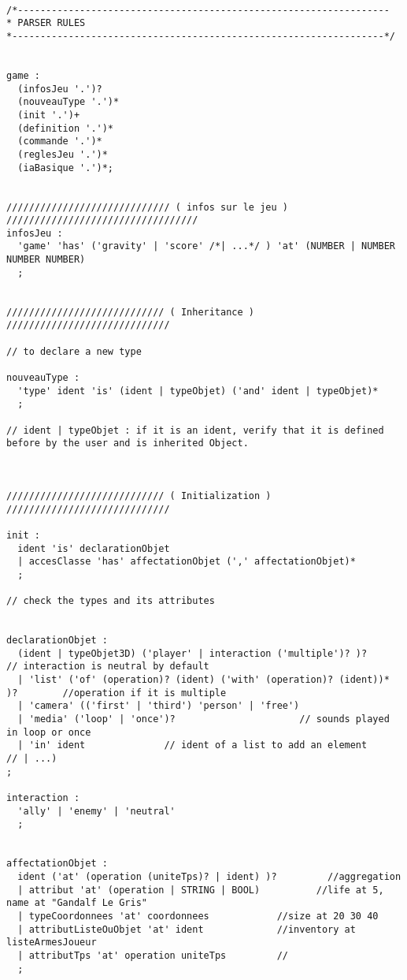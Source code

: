 \begin{lstlisting}[language=GameGrammar]

/*------------------------------------------------------------------
* PARSER RULES
*------------------------------------------------------------------*/
 
 
game :
  (infosJeu '.')?
  (nouveauType '.')*
  (init '.')+
  (definition '.')*
  (commande '.')*
  (reglesJeu '.')*
  (iaBasique '.')*;
 

///////////////////////////// ( infos sur le jeu )  //////////////////////////////////
infosJeu :
  'game' 'has' ('gravity' | 'score' /*| ...*/ ) 'at' (NUMBER | NUMBER NUMBER NUMBER)
  ;
 
 
//////////////////////////// ( Inheritance )  /////////////////////////////
 
// to declare a new type

nouveauType :
  'type' ident 'is' (ident | typeObjet) ('and' ident | typeObjet)*
  ;            
  
// ident | typeObjet : if it is an ident, verify that it is defined before by the user and is inherited Object.
 
 
 
//////////////////////////// ( Initialization )  /////////////////////////////

init :
  ident 'is' declarationObjet
  | accesClasse 'has' affectationObjet (',' affectationObjet)*
  ;

// check the types and its attributes
 
 
declarationObjet :
  (ident | typeObjet3D) ('player' | interaction ('multiple')? )?             // interaction is neutral by default
  | 'list' ('of' (operation)? (ident) ('with' (operation)? (ident))* )?        //operation if it is multiple 
  | 'camera' (('first' | 'third') 'person' | 'free')
  | 'media' ('loop' | 'once')? 						// sounds played in loop or once
  | 'in' ident 				// ident of a list to add an element
// | ...)
;           
 
interaction :
  'ally' | 'enemy' | 'neutral'
  ;
 

affectationObjet :
  ident ('at' (operation (uniteTps)? | ident) )?         //aggregation
  | attribut 'at' (operation | STRING | BOOL)          //life at 5, name at "Gandalf Le Gris"
  | typeCoordonnees 'at' coordonnees            //size at 20 30 40
  | attributListeOuObjet 'at' ident             //inventory at listeArmesJoueur
  | attributTps 'at' operation uniteTps         //
  ;
 

\end{lstlisting}
